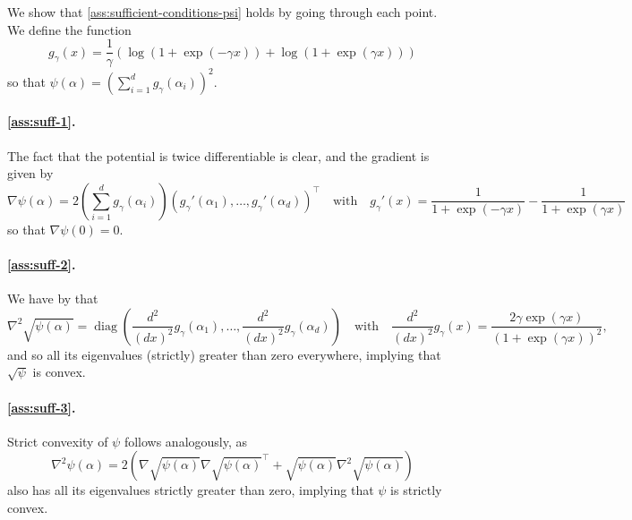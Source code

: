 \documentclass[a4paper]{article}
\newcommand{\pr}[1]{\left(#1\right)}
\DeclareMathOperator{\diagOp}{diag}
\newcommand{\diag}[0]{{\diagOp}}
\theoremstyle{thmstyle}
\theoremstyle{defstyle}
\theoremstyle{remark}
\begin{document}
We show that \cref{ass:sufficient-conditions-psi} holds by going through each point. We define the function
\begin{equation*}
    g_\gamma(x)=\frac{1}{\gamma}\pr{\log(1+\exp(-\gamma x))+\log(1+\exp(\gamma x))}
\end{equation*}
so that $\psi(\alpha) = \pr{\sum_{i=1}^d g_\gamma(\alpha_i)}^2$.

\paragraph{\ref{ass:suff-1}.} The fact that the potential is twice differentiable is clear, and the gradient is given by \citep{Schmidt2007L1approximation}
\begin{equation*}
    \nabla \psi(\alpha) =2\pr{\sum_{i=1}^d g_\gamma(\alpha_i)}\pr{g_\gamma'(\alpha_1),\dots,g_\gamma'(\alpha_d)}^\top \quad \text{with} \quad g_\gamma'(x)= \frac{1}{1+\exp\pr{-\gamma x}}-\frac{1}{1+\exp\pr{\gamma x}}
\end{equation*}
so that $\nabla \psi(0)=0$.

\paragraph{\ref{ass:suff-2}.} We have by \cite{Schmidt2007L1approximation} that
\begin{equation*}
    \nabla^2 \sqrt{\psi(\alpha)} = \diag\pr{\frac{d^2}{(dx)^2}g_\gamma(\alpha_1),\dots, \frac{d^2}{(dx)^2}g_\gamma(\alpha_d)} \quad \text{with} \quad \frac{d^2}{(dx)^2}g_\gamma(x) = \frac{2\gamma \exp(\gamma x)}{\pr{1+\exp(\gamma x)}^2},
\end{equation*}
and so all its eigenvalues (strictly) greater than zero everywhere, implying that $\sqrt{\psi}$ is convex.

\paragraph{\ref{ass:suff-3}.} Strict convexity of $\psi$ follows analogously, as
\begin{equation*}
    \nabla^2 \psi(\alpha) = 2\pr{\nabla\sqrt{\psi(\alpha)}\nabla\sqrt{\psi(\alpha)}^\top + \sqrt{\psi(\alpha)}\nabla^2\sqrt{\psi(\alpha)}}
\end{equation*}
also has all its eigenvalues strictly greater than zero, implying that $\psi$ is strictly convex.
\end{document}

